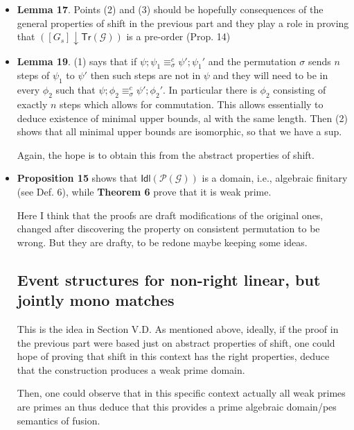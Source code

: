 \documentclass{llncs}
\newcommand{\ideal}[1]{\ensuremath{\mathsf{Idl}({#1})}}
\newcommand{\slice}[2]{\ensuremath{({#1} \downarrow {#2})}}
\newcommand{\poset}[1]{\ensuremath{\mathcal{P}({#1})}}
\newcommand{\tr}[1]{\ensuremath{\mathsf{Tr}({#1})}}
\begin{document}
\begin{itemize}

\item
  \textbf{Lemma 17}. Points (2) and (3) should be hopefully consequences of the general properties of shift in the previous part and they play a role in proving that $\slice{[G_s]}{\tr{\mathcal{G}}}$ is a pre-order (Prop. 14)

\item
  \textbf{Lemma 19}.
  (1) says that if $\psi; \psi_1 \equiv^c_\sigma \psi'; \psi_1'$ and the permutation $\sigma$ sends $n$ steps of $\psi_1$ to $\psi'$ then such steps are not in $\psi$ and they will need to be in every $\phi_2$ such that $\psi; \phi_2 \equiv^c_\sigma \psi'; \phi_2'$. In particular there is $\phi_2$ consisting of exactly $n$ steps which allows for commutation. This allows essentially to deduce existence of minimal upper bounds, al with the same length. 
  Then (2) shows that all minimal upper bounds are isomorphic, so that we have a sup.

  Again, the hope is to obtain this from the abstract properties of
  shift.
  
\item \textbf{Proposition 15} shows that $\ideal{\poset{\mathcal{G}}}$
  is a domain, i.e., algebraic finitary (see Def. 6), while
  \textbf{Theorem 6} prove that it is weak prime.

  Here I think that the proofs are draft modifications of the original ones, changed after discovering the property on consistent permutation to be wrong. But they are drafty, to be redone maybe keeping some ideas.


\subsection*{Event structures for non-right linear, but jointly mono matches}

This is the idea in Section V.D. As mentioned above, ideally, if the proof in the previous part were based just on abstract properties of shift, one could hope of proving that shift in this context has the right properties, deduce that the construction produces a weak prime domain.

Then, one could observe that in this specific context actually all weak primes are primes an thus deduce that this provides a prime algebraic domain/pes semantics of fusion.
  
\end{itemize}
\end{document}

